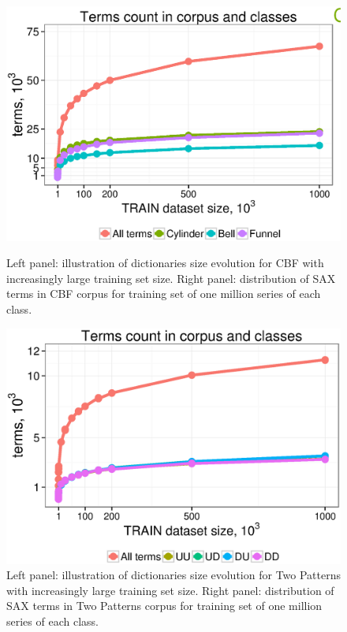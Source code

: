 \begin{figure}[t]
   \centering
   \includegraphics[width=140mm]{figures/words-cbf.ps}
   \caption{Left panel: illustration of dictionaries size evolution for CBF with
   increasingly large training set size. 
   Right panel: distribution of SAX terms in CBF corpus for training set of 
   one million series of each class.}
   \label{fig:venn-cbf}

   \includegraphics[width=140mm]{figures/words-two-patterns.ps}
   \caption{Left panel: illustration of dictionaries size evolution for Two Patterns with increasingly large training set size. 
   Right panel: distribution of SAX terms in Two Patterns corpus for training set of one million series of each class.}
   \label{fig:venn-2p}
\end{figure}

